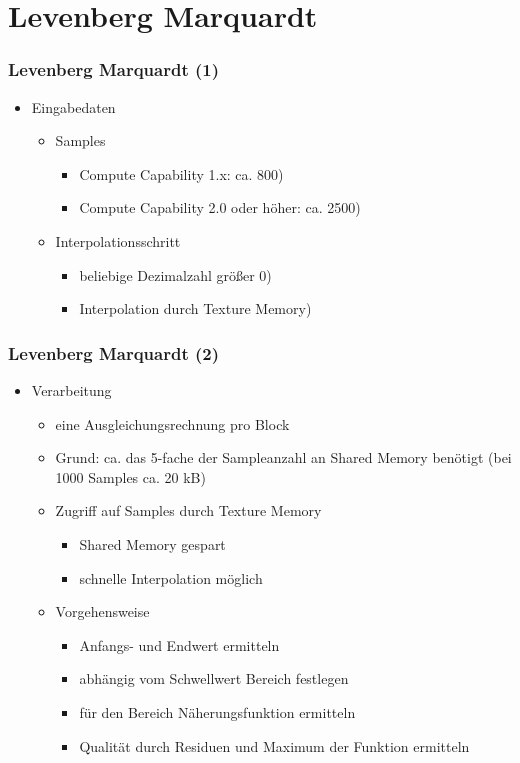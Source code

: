 \documentclass[ddcfooter]{tudbeamer}
\begin{document}
\section{Levenberg Marquardt}
\begin{frame}
    \frametitle*{Levenberg Marquardt (1)}
    \begin{itemize}
        \item{Eingabedaten}
        	\begin{itemize}
        		\item{Samples}
	        		\begin{itemize}
	        			\item{Compute Capability 1.x: ca. 800)}
	        			\item{Compute Capability 2.0 oder höher: ca. 2500)}
	        		\end{itemize}
        		\item{Interpolationsschritt}
	        		\begin{itemize}
	        			\item{beliebige Dezimalzahl größer 0)}
	        			\item{Interpolation durch Texture Memory)}
	        		\end{itemize}
        	\end{itemize}
    \end{itemize}
\end{frame}
\begin{frame}
    \frametitle*{Levenberg Marquardt (2)}
    \begin{itemize}
        \item{Verarbeitung}
            \begin{itemize}
             	\item{eine Ausgleichungsrechnung pro Block}
             	\item{Grund: ca. das 5-fache der Sampleanzahl an Shared Memory benötigt (bei 1000 Samples ca. 20 kB)}
             	\item{Zugriff auf Samples durch Texture Memory}
	             	\begin{itemize}
	             	    \item{Shared Memory gespart}
	             	    \item{schnelle Interpolation möglich}
	             	\end{itemize}
             	\item{Vorgehensweise}
	             	\begin{itemize}
	           	        \item{Anfangs- und Endwert ermitteln}
	           	        \item{abhängig vom Schwellwert Bereich festlegen}
	           	        \item{für den Bereich Näherungsfunktion ermitteln}
	           	        \item{Qualität durch Residuen und Maximum der Funktion ermitteln}
	         	    \end{itemize}
            \end{itemize}
    \end{itemize}
\end{frame}
\end{document}

